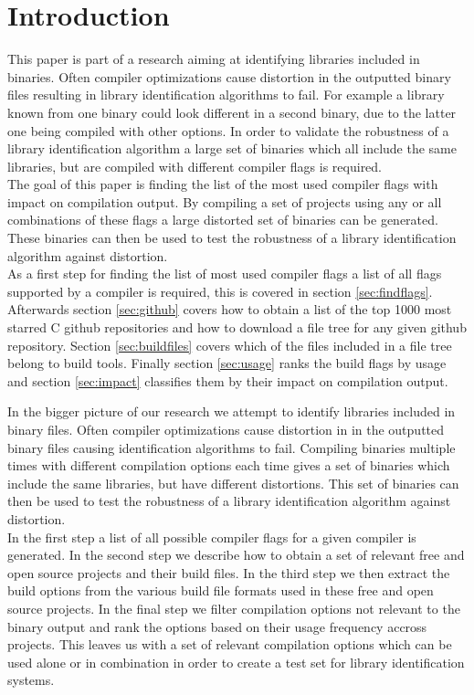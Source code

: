 \documentclass[9pt, a4paper, twocolumn]{article}
\begin{document}
\section{Introduction}
This paper is part of a research aiming at identifying libraries included in binaries. Often compiler optimizations cause distortion in the outputted binary files resulting in library identification algorithms to fail. For example a library known from one binary could look different in a second binary, due to the latter one being compiled with other options. In order to validate the robustness of a library identification algorithm a large set of binaries which all include the same libraries, but are compiled with different compiler flags is required. \\
The goal of this paper is finding the list of the most used compiler flags with impact on compilation output. By compiling a set of projects using any or all combinations of these flags a large distorted set of binaries can be generated. These binaries can then be used to test the robustness of a library identification algorithm against distortion. \\
As a first step for finding the list of most used compiler flags a list of all flags supported by a compiler is required, this is covered in section \ref{sec:findflags}. Afterwards section \ref{sec:github} covers how to obtain a list of the top 1000 most starred C github repositories and how to download a file tree for any given github repository. Section \ref{sec:buildfiles} covers which of the files included in a file tree belong to build tools. Finally section \ref{sec:usage} ranks the build flags by usage and section \ref{sec:impact} classifies them by their impact on compilation output.

\iffalse
In the bigger picture of our research we attempt to identify libraries included in binary files. Often compiler optimizations cause distortion in in the outputted binary files causing identification algorithms to fail. Compiling binaries multiple times with different compilation options each time gives a set of binaries which include the same libraries, but have different distortions. This set of binaries can then be used to test the robustness of a library identification algorithm against distortion. \\

In the first step a list of all possible compiler flags for a given compiler is generated. In the second step we describe how to obtain a set of relevant free and open source projects and their build files. In the third step we then extract the build options from the various build file formats used in these free and open source projects. In the final step we filter compilation options not relevant to the binary output and rank the options based on their usage frequency accross projects. This leaves us with a set of relevant compilation options which can be used alone or in combination in order to create a test set for library identification systems. \\
\end{document}
